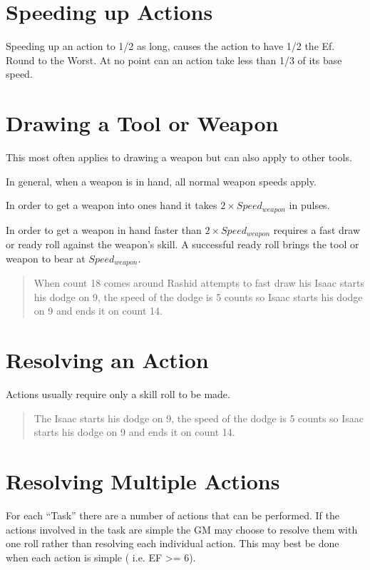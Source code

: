 \section{Speeding up Actions}

Speeding up an action to 1/2 as long, causes the action to have 1/2 the 
Ef. Round to the Worst. At no point can an action take less than 1/3 
of its base speed.

\section{Drawing a Tool or Weapon}

This most often applies to drawing a weapon but can also apply to 
other tools.

In general, when a weapon is in hand, all normal weapon speeds apply. 

In order to get a weapon into ones hand it takes \( 2 \times 
Speed_{weapon} \) in pulses. 

In order to get a weapon in hand faster than \( 2 \times 
Speed_{weapon} \) requires a fast draw or ready roll against the weapon's 
skill. A successful ready roll brings the tool or weapon to bear at 
\( Speed_{weapon} \).  

\begin{quote}
When count 18 comes around Rashid attempts to fast draw his Isaac starts his dodge on 9, the speed of the dodge is 5 counts so 
Isaac starts his dodge on 9 and ends it on count 14. 
\end{quote}
 

\section{Resolving an Action}
Actions usually require only a skill roll to be made. 

\begin{quote}
The 
Isaac starts his dodge on 9, the speed of the dodge is 5 counts so 
Isaac starts his dodge on 9 and ends it on count 14. 
\end{quote}



\section{Resolving Multiple Actions}

For each ``Task'' there are a number of actions that can be performed. 
If the actions involved in the task are simple the GM may choose to resolve 
them with one roll rather than resolving each individual action. This may best 
be done when each action is simple ( i.e. EF >= 6). 

